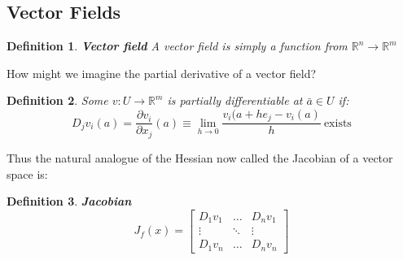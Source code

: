 \documentclass[titlepage]{article}
\newtheorem{definition}{Definition}
\newcommand{\Rm}{\mathbb{R}^m}
\begin{document}
\subsection{Vector Fields}

\begin{definition}\textbf{Vector field}
A vector field is simply a function from $\mathbb{R}^{n} \to \Rm$
\end{definition}

How might we imagine the partial derivative of a vector field?

\begin{definition}
Some $v: U \to \Rm$ is partially differentiable at $\bar{a} \in U$ if:
$$D_{j}v_{i}(a) = \frac{\partial v_{i}}{\partial x_{j}}(a) \equiv \lim_{h \to 0} \frac{v_{i}(a+he_{j}-v_{i}(a)}{h} \ \text{exists}$$
\end{definition}

Thus the natural analogue of the Hessian now called the Jacobian of a vector space is:
\begin{definition}\textbf{Jacobian}
$$ J_{f}(x) = 
\begin{bmatrix}
 D_{1}v_{1} & \ldots & D_{n}v_{1}\\
 \vdots & \ddots & \vdots\\
 D_{1}v_{n} & \ldots & D_{n}v_{n}
\end{bmatrix}
$$
\end{definition}
\end{document}
